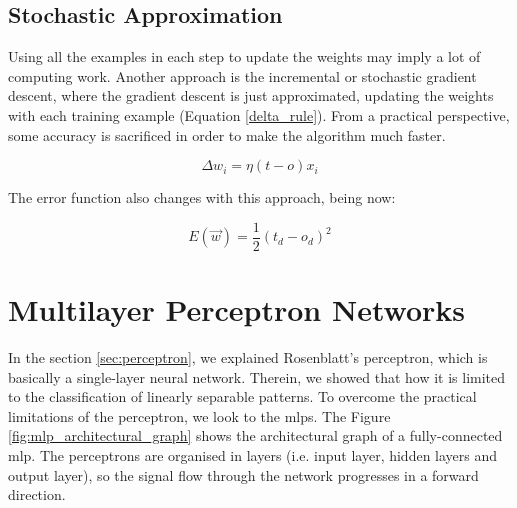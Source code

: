 	\subsection{Stochastic Approximation}
	Using all the examples in each step to update the weights may imply a lot of computing work. Another approach is the incremental or stochastic gradient descent, where the gradient descent is just approximated, updating the weights with each training example (Equation \ref{delta_rule}). From a practical perspective, some accuracy is sacrificed in order to make the algorithm much faster.

	\begin{equation}
		\label{delta_rule}
		\Delta w_{i}= \eta (t - o) x_{i}
	\end{equation}

	The error function also changes with this approach, being now:

	\begin{equation}
		\label{error_function_stoc_square}
		E(\vec{w}) = \frac{1}{2} (t_d-o_d)^2 
	\end{equation}



                                                                              

\section{Multilayer Perceptron Networks}
In the section \ref{sec:perceptron}, we explained Rosenblatt’s perceptron, which is basically a single-layer neural network. Therein, we showed that how it is limited to the classification of linearly separable patterns. To overcome the practical limitations of the perceptron, we look to the \glspl{mlp}. The Figure \ref{fig:mlp_architectural_graph} shows the architectural graph of a fully-connected \gls{mlp}. The perceptrons are organised in layers (i.e. input layer, hidden layers and output layer), so the signal flow through the network progresses in a forward direction.

